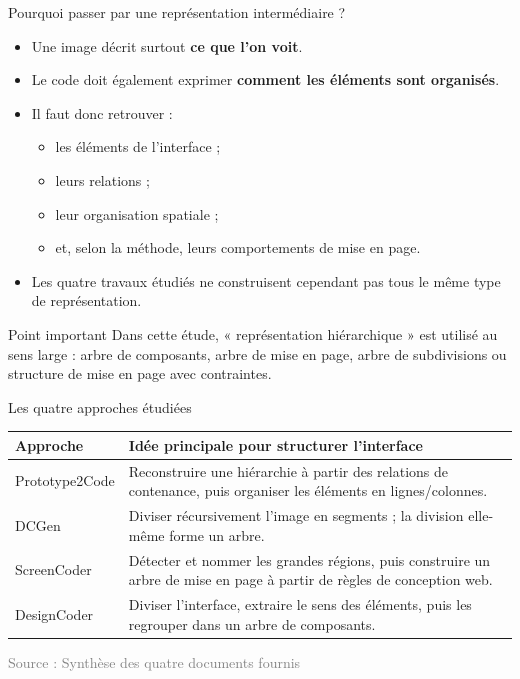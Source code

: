 \documentclass[aspectratio=169,11pt]{beamer}
\newcommand{\source}[1]{\scriptsize\textcolor{gray}{Source : #1}}
\begin{document}
\begin{frame}{Pourquoi passer par une représentation intermédiaire ?}
\begin{itemize}
  \item Une image décrit surtout \textbf{ce que l'on voit}.
  \item Le code doit également exprimer \textbf{comment les éléments sont organisés}.
  \item Il faut donc retrouver :
  \begin{itemize}
    \item les éléments de l'interface ;
    \item leurs relations ;
    \item leur organisation spatiale ;
    \item et, selon la méthode, leurs comportements de mise en page.
  \end{itemize}
  \item Les quatre travaux étudiés ne construisent cependant pas tous le même type de représentation.
\end{itemize}

\vspace{0.25cm}
\begin{alertblock}{Point important}
Dans cette étude, « représentation hiérarchique » est utilisé au sens large :
arbre de composants, arbre de mise en page, arbre de subdivisions ou
structure de mise en page avec contraintes.
\end{alertblock}
\end{frame}

\begin{frame}{Les quatre approches étudiées}
\small
\begin{tabularx}{\textwidth}{>{\raggedright\arraybackslash}p{3.0cm} X}
\toprule
\textbf{Approche} & \textbf{Idée principale pour structurer l'interface}\\
\midrule
Prototype2Code & Reconstruire une hiérarchie à partir des relations de contenance, puis organiser les éléments en lignes/colonnes.\\
DCGen & Diviser récursivement l'image en segments ; la division elle-même forme un arbre.\\
ScreenCoder & Détecter et nommer les grandes régions, puis construire un arbre de mise en page à partir de règles de conception web.\\
DesignCoder & Diviser l'interface, extraire le sens des éléments, puis les regrouper dans un arbre de composants.\\
\bottomrule
\end{tabularx}

\vspace{0.25cm}
\source{Synthèse des quatre documents fournis}
\end{frame}
\end{document}
